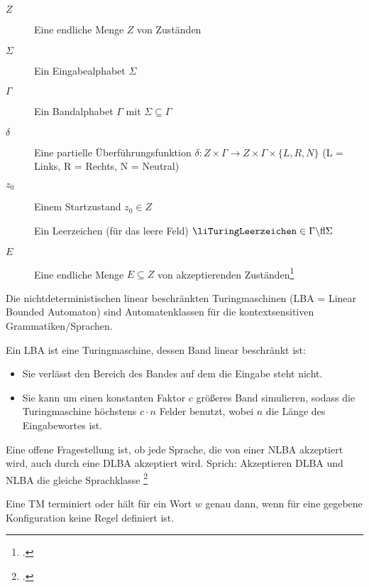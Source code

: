 \documentclass{lehramt-informatik-haupt}
\begin{document}
\begin{description}
\item[$Z$]
Eine endliche Menge $Z$ von Zuständen

\item[$\Sigma$]
Ein Eingabealphabet $\Sigma$

\item[$\Gamma$]
Ein Bandalphabet $\Gamma$ mit $\Sigma \subseteq\Gamma$

\item[$\delta$]
Eine partielle Überführungsfunktion
$\delta : Z \times \Gamma \rightarrow Z \times \Gamma \times \{ L, R, N \}$ (L = Links, R = Rechts, N = Neutral)

\item[$z_0$]
Einem Startzustand $z_0 \in Z$

\item[\liTuringLeerzeichen]
Ein Leerzeichen (für das leere Feld) $\liTuringLeerzeichen \in \Gamma \string\ \Sigma$

\item[$E$]
Eine endliche Menge $E \subseteq Z$ von
akzeptierenden Zuständen\footcite[Seite 21]{theo:fs:3}
\end{description}

Die nichtdeterministischen linear beschränkten Turingmaschinen
(LBA = Linear Bounded Automaton) sind Automatenklassen für die
kontextsensitiven Grammatiken/Sprachen.

Ein LBA ist eine Turingmaschine, dessen Band linear beschränkt ist:

\begin{itemize}
\item[Definition 1]

Sie verlässt den Bereich des Bandes auf dem die Eingabe steht nicht.

\item[Definition 2]

Sie kann um einen konstanten Faktor $c$ größeres Band simulieren, sodass
die Turingmaschine höchstens $c \cdot n$ Felder benutzt, wobei $n$ die
Länge des Eingabewortes ist.
\end{itemize}

Eine offene Fragestellung ist, ob jede Sprache, die von einer NLBA
akzeptiert wird, auch durch eine DLBA akzeptiert wird. Sprich:
Akzeptieren DLBA und NLBA die gleiche Sprachklasse
\footcite[Seite 10]{theo:fs:3}

Eine TM terminiert oder hält für ein Wort $w$ genau dann, wenn für
eine gegebene Konfiguration keine Regel definiert ist.
\end{document}
